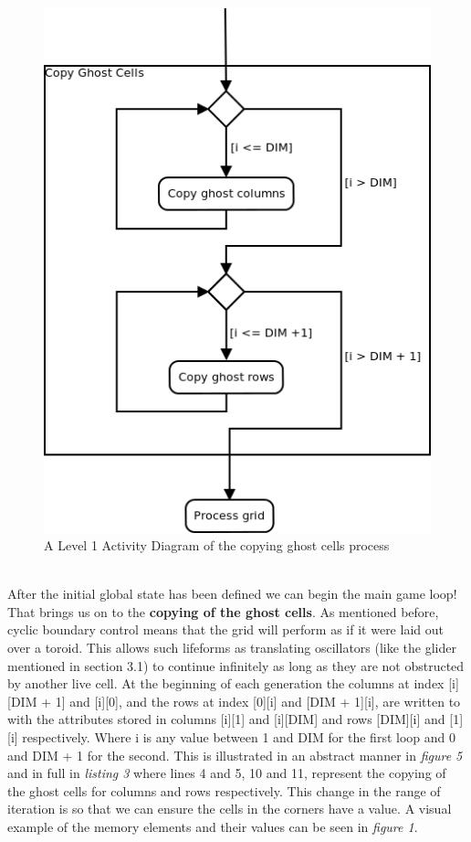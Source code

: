 \documentclass[11pt]{article} %
\begin{document}
\begin{figure}[h]
\centering
\includegraphics[scale=0.5]{sequentialGhost.png}
\caption{A Level 1 Activity Diagram of the copying ghost cells process}
\label{fig: Algo1}
\end{figure}
\\After the initial global state has been defined we can begin the main game loop! That brings us on to the {\bf copying of the ghost cells}. As mentioned before, cyclic boundary control means that the grid will perform as if it were laid out over a toroid. This allows such lifeforms as translating oscillators (like the glider mentioned in section 3.1) to continue infinitely as long as they are not obstructed by another live cell. At the beginning of each generation the columns at index [i][DIM + 1] and [i][0], and the rows at index [0][i] and [DIM + 1][i], are written to with the attributes stored in columns [i][1] and [i][DIM] and rows [DIM][i] and [1][i] respectively. Where i is any value between 1 and DIM for the first loop and 0 and DIM + 1 for the second. This is illustrated in an abstract manner in {\it figure 5} and in full in {\it listing 3} where lines 4 and 5, 10 and 11, represent the copying of the ghost cells for columns and rows respectively. This change in the range of iteration is so that we can ensure the cells in the corners have a value. A visual example of the memory elements and their values can be seen in {\it figure 1}. 
\end{document}
